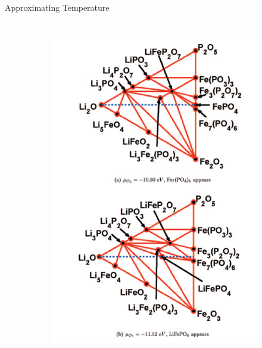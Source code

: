 \documentclass[aspectratio=169]{beamer}
\begin{document}
\begin{frame}{Approximating Temperature}
\begin{columns}
\begin{figure}
    \centering
    \begin{subfigure}{0.47\textwidth}
        \centering
        \includegraphics[width=\linewidth]{lectures/figures/10_LFP_PD.png}
    \end{subfigure}
    \begin{subfigure}{0.47\textwidth}
        \centering

\end{subfigure}
\end{figure}
\end{columns}
\end{frame}
\end{document}

